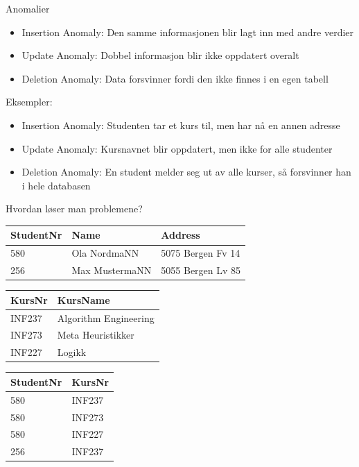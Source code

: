 \begin{frame}{Anomalier}
\begin{itemize}
    \item Insertion Anomaly: Den samme informasjonen blir lagt inn med andre verdier
    \item Update Anomaly: Dobbel informasjon blir ikke oppdatert overalt
    \item Deletion Anomaly: Data forsvinner fordi den ikke finnes i en egen tabell
\end{itemize}
\medskip
Eksempler:
\begin{itemize}
    \item Insertion Anomaly: Studenten tar et kurs til, men har nå en annen adresse 
    \item Update Anomaly: Kursnavnet blir oppdatert, men ikke for alle studenter
    \item Deletion Anomaly: En student melder seg ut av alle kurser, så forsvinner han i hele databasen
\end{itemize}
\end{frame}

\begin{frame}{Hvordan løser man problemene?}
\begin{tabular}{l|l|l}
 StudentNr & Name & Address\\\hline
 580 & Ola NordmaNN & 5075 Bergen Fv 14\\
 256 & Max MustermaNN & 5055 Bergen Lv 85\\
\end{tabular}
\vfill
\begin{tabular}{l|l}
KursNr & KursName \\\hline
INF237 & Algorithm Engineering\\
INF273 & Meta Heuristikker\\
INF227 & Logikk\\
\end{tabular}
\hfill
\begin{tabular}{l|l}
 StudentNr & KursNr\\\hline
 580 & INF237\\
 580 & INF273\\
 580 & INF227\\
 256 & INF237\\
\end{tabular}
\end{frame}

